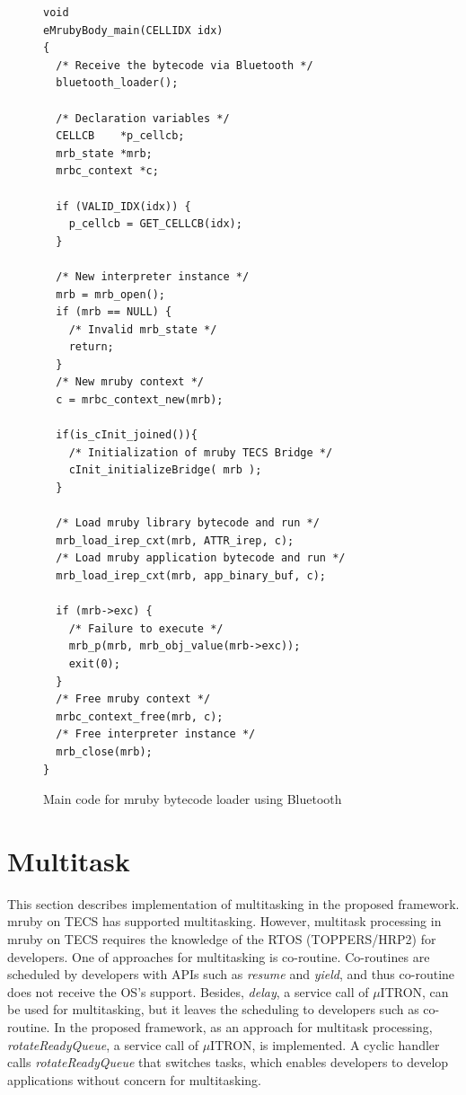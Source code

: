 \documentclass[conference,compsoc]{IEEEtran}
\begin{document}
\begin{figure}[t]
\centering
\begin{lstlisting}
void
eMrubyBody_main(CELLIDX idx)
{
  /* Receive the bytecode via Bluetooth */
  bluetooth_loader();

  /* Declaration variables */
  CELLCB	*p_cellcb;
  mrb_state *mrb;
  mrbc_context *c;

  if (VALID_IDX(idx)) {
    p_cellcb = GET_CELLCB(idx);
  }

  /* New interpreter instance */
  mrb = mrb_open();
  if (mrb == NULL) {
    /* Invalid mrb_state */
    return;
  }
  /* New mruby context */
  c = mrbc_context_new(mrb);

  if(is_cInit_joined()){
    /* Initialization of mruby TECS Bridge */
    cInit_initializeBridge( mrb );
  }

  /* Load mruby library bytecode and run */
  mrb_load_irep_cxt(mrb, ATTR_irep, c);
  /* Load mruby application bytecode and run */
  mrb_load_irep_cxt(mrb, app_binary_buf, c);

  if (mrb->exc) {
    /* Failure to execute */
    mrb_p(mrb, mrb_obj_value(mrb->exc));
    exit(0);
  }
  /* Free mruby context */
  mrbc_context_free(mrb, c);
  /* Free interpreter instance */
  mrb_close(mrb);
}

\end{lstlisting}
\caption{Main code for mruby bytecode loader using Bluetooth}
\label{maincode_mrubybluetooth}
\end{figure}
\section{Multitask}
\label{sec:Multitask}
This section describes implementation of multitasking in the proposed framework.
mruby on TECS has supported multitasking.
However, multitask processing in mruby on TECS requires the knowledge of the RTOS (TOPPERS/HRP2) for developers.
One of approaches for multitasking is co-routine.
Co-routines are scheduled by developers with APIs such as {\it resume} and {\it yield}, and thus co-routine does not receive the OS's support.
Besides, {\it delay}, a service call of $\mu$ITRON, can be used for multitasking, but it leaves the scheduling to developers such as co-routine.
In the proposed framework, as an approach for multitask processing, {\it rotateReadyQueue}, a service call of $\mu$ITRON, is implemented.
A cyclic handler calls {\it rotateReadyQueue} that switches tasks, which enables developers to develop applications without concern for multitasking.
\end{document}

